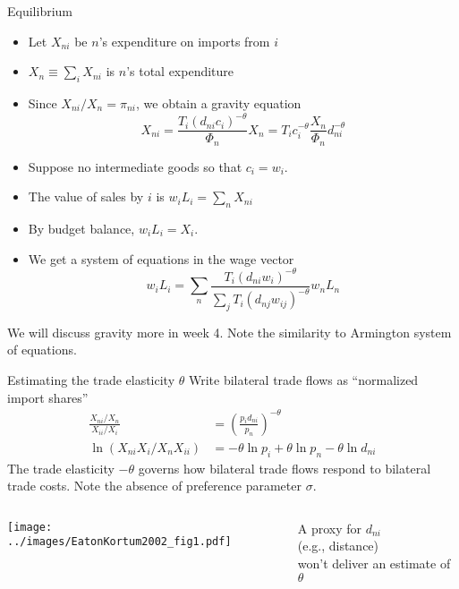 \documentclass[10pt,notes=hide]{beamer}
\begin{document}
\begin{frame}{Equilibrium}
\begin{itemize}
	\item Let $X_{ni}$ be $n$'s expenditure on imports from $i$
	\item $X_n \equiv \sum_{i} X_{ni}$ is $n$'s total expenditure
	\item Since $X_{ni} / X_n = \pi_{ni}$, we obtain a gravity equation
	\begin{equation*} 
	X_{ni} 
	= \frac{T_{i}\left( d _{ni}c_{i}\right) ^{-\theta}}{\Phi_n} X_n 
	= T_{i}c_{i}^{-\theta} \frac{X_n}{\Phi_n} d_{ni}^{-\theta} 
	\end{equation*}
	\item Suppose no intermediate goods so that $c_i = w_i$.
	\item The value of sales by $i$ is $w_i L_i = \sum_{n} X_{ni}$
	\item By budget balance, $w_i L_i = X_i$.
	\item We get a system of equations in the wage vector
		\begin{equation*}w_i L_i = \sum_n \frac{T_{i}\left( d _{ni}w_{i}\right) ^{-\theta}}{\sum _j T_{i}\left( d _{nj}w_{ij}\right) ^{-\theta}} w_n L_n
		\end{equation*}
\end{itemize}
We will discuss gravity more in week 4. Note the similarity to Armington system of equations.
\end{frame}
\begin{frame}{Estimating the trade elasticity $\theta$}
Write bilateral trade flows as ``normalized import shares''
\begin{align*}
\frac{X_{ni}/X_{n}}{X_{ii}/X_{i}} 
&=
\left( \frac{p_{i}d_{ni}}{p_{n}}\right) ^{-\theta} \\
\ln \left(X_{ni}X_{i}/X_{n} X_{ii} \right)
&=
-\theta \ln p_{i}+\theta \ln
p_{n}-\theta \ln d_{ni}
\end{align*}
The trade elasticity $-\theta$ governs how bilateral trade flows respond to bilateral trade costs.
Note the absence of preference parameter $\sigma$.
\begin{columns}
\begin{column}{.68\textwidth}
\texttt{[image: ../images/EatonKortum2002\_fig1.pdf]}
\end{column}
\begin{column}{.3\textwidth}
A proxy for $d_{ni}$ \\(e.g., distance) \\ won't deliver an estimate of $\theta$
\end{column}
\end{columns}
\end{frame}
\end{document}
